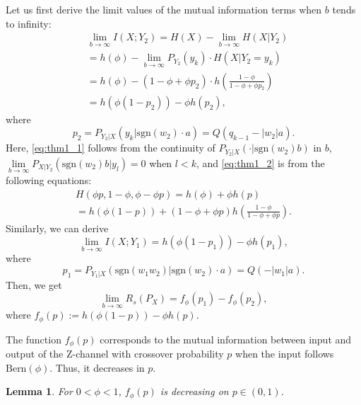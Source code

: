 \documentclass[journal]{IEEEtran}
\newtheorem{lemma}[theorem]{Lemma}
\begin{document}
\begin{IEEEproof}
Let us first derive the limit values of the mutual information terms when $b$ tends to infinity:  
\begin{align}
    &\lim\limits_{b\rightarrow\infty} I(X;Y_2) =  H(X) - \lim\limits_{b\rightarrow\infty}H(X|Y_2)
    \\& = h(\phi) - \lim\limits_{b\rightarrow \infty} P_{Y_2}(y_k) \cdot H(X|Y_2=y_k) \label{eq:thm1_1}
    \\& = h(\phi) - (1-\phi + \phi p_2) \cdot h\left(\frac{1-\phi}{1-\phi + \phi p_2 }\right)
    \\& = h(\phi(1-p_2)) - \phi h(p_2), \label{eq:thm1_2}
\end{align}
where
\begin{equation}
    p_2 = P_{Y_2|X}(y_k|\text{sgn}(w_2)\cdot a) = Q(q_{k-1}- |w_2| a). \label{eq:p2}
\end{equation}
Here, \eqref{eq:thm1_1} follows from the continuity of $P_{Y_2|X}(\cdot|\mathrm{sgn}(w_2)b)$ in $b$, $\lim\limits_{b\rightarrow \infty} P_{X|Y_2}(\text{sgn}(w_2)b|y_l)=0$ when $l<k$, and \eqref{eq:thm1_2} is from the following equations: 
\begin{multline}
    H(\phi p, 1-\phi, \phi-\phi p) = h(\phi) + \phi h(p) \\ = h(\phi(1-p)) + (1-\phi +\phi p) h\left( \frac{1-\phi}{1-\phi + \phi p} \right).
\end{multline}
Similarly, we can derive 
\begin{equation}
    \lim\limits_{b\rightarrow\infty} I(X;Y_1) = h \left( \phi(1-p_1) \right) - \phi h \left( p_1 \right),
\end{equation}
where
\begin{equation}
    p_1 = P_{Y_1|X}(\text{sgn}(w_1 w_2)|\text{sgn}(w_2)\cdot a) = Q(-|w_1| a). \label{eq:p1}
\end{equation}
Then, we get
\begin{equation}
   \lim\limits_{b \rightarrow \infty} R_s(P_X) = f_{\phi}(p_1) - f_{\phi}(p_2), \label{eq:Zchannel_difference}
\end{equation}
where ${f_\phi(p) := h (\phi(1-p)) - \phi h (p)}$.

The function $f_\phi (p)$ corresponds to the mutual information between input and output of the Z-channel with crossover probability $p$ when the input follows $\mbox{Bern}(\phi)$. Thus, it decreases in $p$.
\begin{lemma}\label{lem:f_decreasing}
For $0 < \phi < 1$, $f_\phi(p)$ is decreasing on ${p\in(0,1)}$.
\end{lemma}


\end{IEEEproof}
\end{document}
